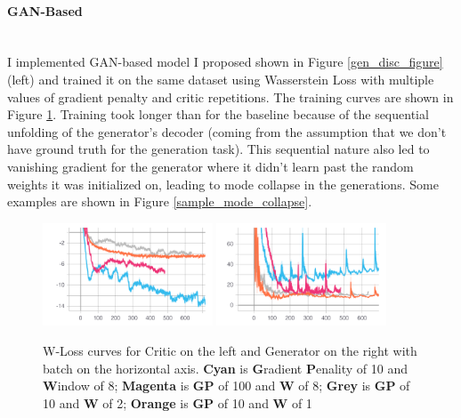 \documentclass{article}
\begin{document}
\paragraph{GAN-Based}$ $
\\I implemented GAN-based model I proposed shown in Figure \ref{gen_disc_figure} (left) and trained it on the same dataset using Wasserstein Loss \cite{wloss} with multiple values of gradient penalty and critic repetitions. The training curves are shown in Figure \ref{sequential_training_loss}. Training took longer than for the baseline because of the sequential unfolding of the generator's decoder (coming from the assumption that we don't have ground truth for the generation task).  This sequential nature also led to vanishing gradient for the generator where it didn't learn past the random weights it was initialized on, leading to mode collapse in the generations. Some examples are shown in Figure \ref{sample_mode_collapse}.
\begin{figure}
    \centering
    \includegraphics[width=0.45\textwidth]{Loss_train_crit_collapse}
     \includegraphics[width=0.45\textwidth]{Loss_train_gen_collapse}\\
    \caption{W-Loss curves for Critic on the left and Generator on the right with batch on the horizontal axis. \textbf{Cyan} is \textbf{G}radient \textbf{P}enality of 10 and \textbf{W}indow of 8; \textbf{Magenta} is \textbf{GP} of 100 and \textbf{W} of 8; \textbf{Grey} is \textbf{GP} of 10 and \textbf{W} of 2; \textbf{Orange} is \textbf{GP} of 10 and \textbf{W} of 1 }
    \label{sequential_training_loss}
\end{figure}
\end{document}
